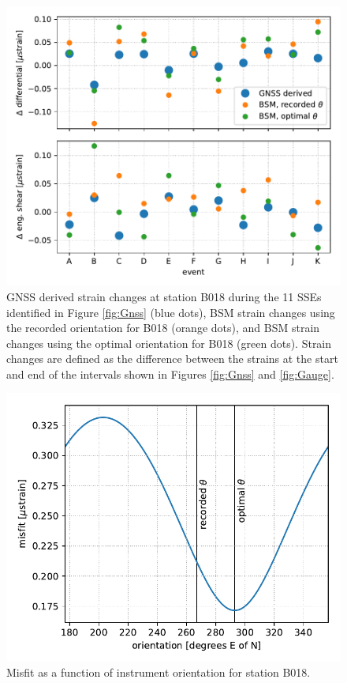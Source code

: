 \documentclass[10pt,a4paper]{article}
\begin{document}
\begin{figure}
\includegraphics{figures/fit.pdf}
\caption{GNSS derived strain changes at station B018 during the 11 SSEs identified in Figure \ref{fig:Gnss} (blue dots), BSM strain changes using the recorded orientation for B018 (orange dots), and BSM strain changes using the optimal orientation for B018 (green dots). Strain changes are defined as the difference between the strains at the start and end of the intervals shown in Figures \ref{fig:Gnss} and \ref{fig:Gauge}.}   
\label{fig:Fit}
\end{figure}

\begin{figure}
\includegraphics{figures/misfit.pdf}
\caption{Misfit as a function of instrument orientation for station B018.}   
\label{fig:Misfit}
\end{figure}
\end{document}
